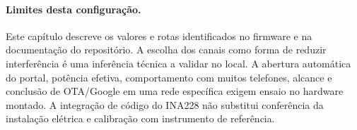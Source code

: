 \paragraph{Limites desta configuração.}
Este capítulo descreve os valores e rotas identificados no firmware e na documentação do repositório. A escolha dos canais como forma de reduzir interferência é uma inferência técnica a validar no local. A abertura automática do portal, potência efetiva, comportamento com muitos telefones, alcance e conclusão de OTA/Google em uma rede específica exigem ensaio no hardware montado. A integração de código do INA228 não substitui conferência da instalação elétrica e calibração com instrumento de referência.
